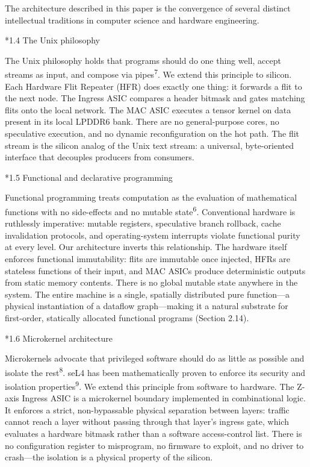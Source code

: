 \documentclass[12pt]{article}
\makeatletter
\renewcommand\subsection{\@startsection{subsection}{2}{\z@}{-1.0ex \@plus -0.2ex}{0.3ex}{\normalsize\bfseries}}
\makeatother
\begin{document}
The architecture described in this paper is the convergence of several distinct intellectual traditions in computer science and hardware engineering.

\subsection*{1.4 The Unix philosophy}

The Unix philosophy holds that programs should do one thing well, accept streams as input, and compose via pipes\textsuperscript{7}. We extend this principle to silicon. Each Hardware Flit Repeater (HFR) does exactly one thing: it forwards a flit to the next node. The Ingress ASIC compares a header bitmask and gates matching flits onto the local network. The MAC ASIC executes a tensor kernel on data present in its local LPDDR6 bank. There are no general-purpose cores, no speculative execution, and no dynamic reconfiguration on the hot path. The flit stream is the silicon analog of the Unix text stream: a universal, byte-oriented interface that decouples producers from consumers.

\subsection*{1.5 Functional and declarative programming}

Functional programming treats computation as the evaluation of mathematical functions with no side-effects and no mutable state\textsuperscript{6}. Conventional hardware is ruthlessly imperative: mutable registers, speculative branch rollback, cache invalidation protocols, and operating-system interrupts violate functional purity at every level. Our architecture inverts this relationship. The hardware itself enforces functional immutability: flits are immutable once injected, HFRs are stateless functions of their input, and MAC ASICs produce deterministic outputs from static memory contents. There is no global mutable state anywhere in the system. The entire machine is a single, spatially distributed pure function---a physical instantiation of a dataflow graph---making it a natural substrate for first-order, statically allocated functional programs (Section 2.14).

\subsection*{1.6 Microkernel architecture}

Microkernels advocate that privileged software should do as little as possible and isolate the rest\textsuperscript{8}. seL4 has been mathematically proven to enforce its security and isolation properties\textsuperscript{9}. We extend this principle from software to hardware. The Z-axis Ingress ASIC is a microkernel boundary implemented in combinational logic. It enforces a strict, non-bypassable physical separation between layers: traffic cannot reach a layer without passing through that layer's ingress gate, which evaluates a hardware bitmask rather than a software access-control list. There is no configuration register to misprogram, no firmware to exploit, and no driver to crash---the isolation is a physical property of the silicon.
\end{document}
